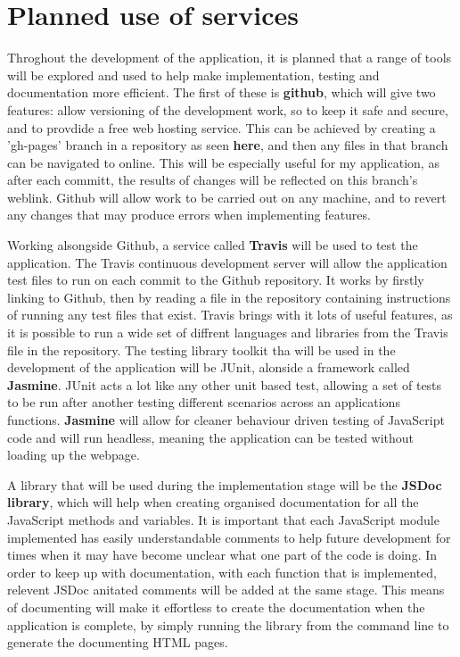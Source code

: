 \section{Planned use of services}
Throghout the development of the application, it is planned that a range of tools will be explored and used to help make implementation, testing and documentation more efficient. The first of these is \textbf{github}, which will give two features: allow versioning of the development work, so to keep it safe and secure, and to provdide a free web hosting service. This can be achieved by creating a 'gh-pages' branch in a repository as seen \textbf{here}, and then any files in that branch can be navigated to online. This will be especially useful for my application, as after each committ, the results of changes will be reflected on this branch's weblink. Github will allow work to be carried out on any machine, and to revert any changes that may produce errors when implementing features.

Working alsongside Github, a service called \textbf{Travis} will be used to test the application. The Travis continuous development server will allow the application test files to run on each commit to the Github repository. It works by firstly linking to Github, then by reading a file in the repository containing instructions of running any test files that exist. Travis brings with it lots of useful features, as it is possible to run a wide set of diffrent languages and libraries from the Travis file in the repository. The testing library toolkit tha will be used in the development of the application will be JUnit, alonside a framework called \textbf{Jasmine}. JUnit acts a lot like any other unit based test, allowing a set of tests to be run after another testing different scenarios across an applications functions. \textbf{Jasmine} will allow for cleaner behaviour driven testing of JavaScript code and will run headless, meaning the application can be tested without loading up the webpage.

A library that will be used during the implementation stage will be the \textbf{JSDoc library}, which will help when creating organised documentation for all the JavaScript methods and variables. It is important that each JavaScript module implemented has easily understandable comments to help future development for times when it may have become unclear what one part of the code is doing. In order to keep up with documentation, with each function that is implemented, relevent JSDoc anitated comments will be added at the same stage. This means of documenting will make it effortless to create the documentation when the application is complete, by simply running the library from the command line to generate the documenting HTML pages.

